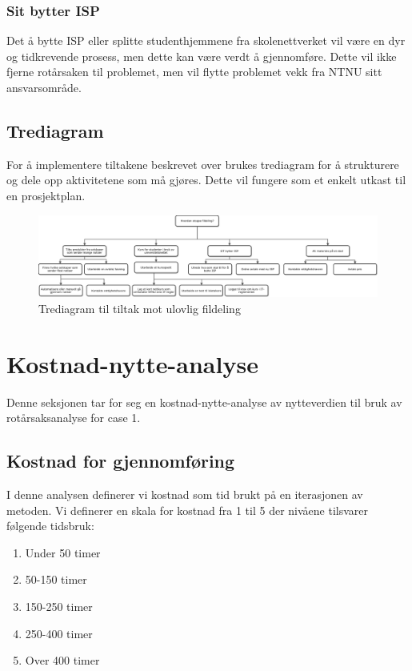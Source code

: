 \subsubsection{Sit bytter ISP}
Det å bytte ISP eller splitte studenthjemmene fra skolenettverket vil være en dyr og tidkrevende prosess, men dette kan være verdt å gjennomføre. Dette vil ikke fjerne rotårsaken til problemet, men vil flytte problemet vekk fra NTNU sitt ansvarsområde.

\subsection{Trediagram}
For å implementere tiltakene beskrevet over brukes trediagram for å strukturere og dele opp aktivitetene som må gjøres. Dette vil fungere som et enkelt utkast til en prosjektplan. 

\begin{figure}[H] 
    \centering    
    \includegraphics[scale=0.55, angle=90]{case_1/bilder/Tre-diagram.pdf}
    \caption[Trediagram til tiltak mot ulovlig fildeling]{Trediagram til tiltak mot ulovlig fildeling}
    \label{fig:case1-Tre-diagram}
\end{figure}

\section{Kostnad-nytte-analyse}
Denne seksjonen tar for seg en kostnad-nytte-analyse av nytteverdien til bruk av rotårsaksanalyse for case 1. 

\subsection{Kostnad for gjennomføring}
I denne analysen definerer vi kostnad som tid brukt på en iterasjonen av metoden. Vi definerer en skala for kostnad fra 1 til 5 der nivåene tilsvarer følgende tidsbruk:

\begin{enumerate}
    \item Under 50 timer
    \item 50-150 timer
    \item 150-250 timer
    \item 250-400 timer
    \item Over 400 timer
\end{enumerate}

